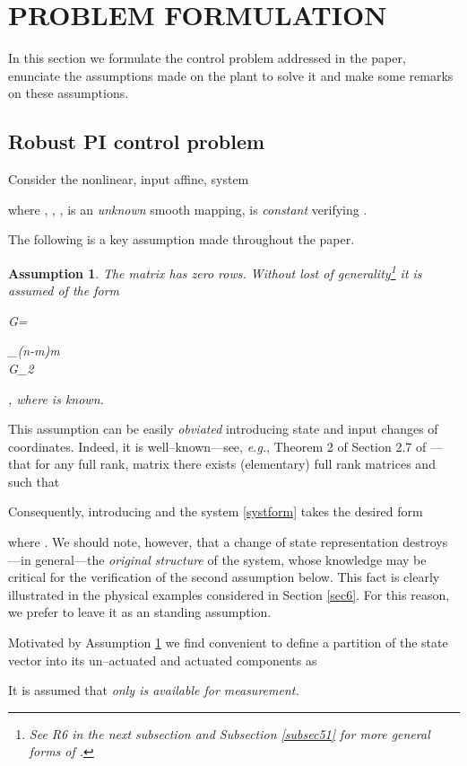 \documentclass[10pt, conference]{ieeeconf}
\newtheorem{assumption}{Assumption}
\def\begequ{}
\def\lab{\label}
\begin{document}
\section{PROBLEM FORMULATION}
\lab{sec2}	
In this section we formulate the control problem addressed in the paper, enunciate the assumptions made on the plant to solve it and make some remarks on these assumptions.
\subsection{Robust PI control problem}
\lab{subsec21}	
Consider the nonlinear, input affine, system

where , , ,  is an {\em unknown} smooth mapping,  is {\em constant} verifying .

The following is a key assumption made throughout the paper.

\begin{assumption} 
\label{as:g}
The matrix  has  zero rows. Without lost of generality\footnote{See R6 in the next subsection and Subsection \ref{subsec51} for more general forms of .} it is assumed of the form
\begequ
\lab{g}
	G=\begin{bmatrix} _{(n-m)\times m} \\ G_2\end{bmatrix},
\endequ
where  is {\em known}.
\end{assumption}

This assumption can be easily {\em obviated} introducing state and input changes of coordinates. Indeed, it is well--known---see, {\em e.g.}, Theorem 2 of Section 2.7 of \cite{LANTIS}---that for any full rank, matrix  there exists (elementary) full rank matrices  and   such that

Consequently, introducing  and  the system \eqref{systform} takes the desired form

where . We should note, however, that a change of state representation destroys---in general---the {\em original structure} of the system, whose knowledge may be critical for the verification of the second assumption below. This fact is clearly illustrated in the physical examples considered in Section \ref{sec6}. For this reason, we prefer to leave it as an standing assumption. 

Motivated by Assumption \ref{as:g} we find convenient to define a partition of the state vector into its un--actuated and actuated components as

It is assumed that {\em only  is available for measurement.}
\end{document}
